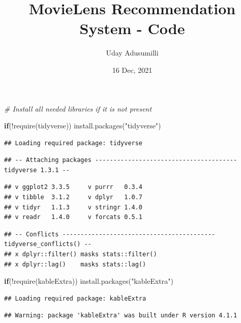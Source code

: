 \documentclass[
]{article}
\title{MovieLens Recommendation System - Code}
\author{Uday Adusumilli}
\date{16 Dec, 2021}
\newenvironment{Shaded}{}{}
\newcommand{\CommentTok}[1]{\textcolor[rgb]{0.38,0.63,0.69}{\textit{#1}}}
\newcommand{\ControlFlowTok}[1]{\textcolor[rgb]{0.00,0.44,0.13}{\textbf{#1}}}
\newcommand{\FunctionTok}[1]{\textcolor[rgb]{0.02,0.16,0.49}{#1}}
\newcommand{\NormalTok}[1]{#1}
\newcommand{\SpecialCharTok}[1]{\textcolor[rgb]{0.25,0.44,0.63}{#1}}
\newcommand{\StringTok}[1]{\textcolor[rgb]{0.25,0.44,0.63}{#1}}
\begin{document}
\maketitle

{
\setcounter{tocdepth}{2}
\tableofcontents
}
\begin{Shaded}
\begin{Highlighting}[]
\CommentTok{\# Install all needed libraries if it is not present}

\ControlFlowTok{if}\NormalTok{(}\SpecialCharTok{!}\FunctionTok{require}\NormalTok{(tidyverse)) }\FunctionTok{install.packages}\NormalTok{(}\StringTok{"tidyverse"}\NormalTok{) }
\end{Highlighting}
\end{Shaded}

\begin{verbatim}
## Loading required package: tidyverse
\end{verbatim}

\begin{verbatim}
## -- Attaching packages --------------------------------------- tidyverse 1.3.1 --
\end{verbatim}

\begin{verbatim}
## v ggplot2 3.3.5     v purrr   0.3.4
## v tibble  3.1.2     v dplyr   1.0.7
## v tidyr   1.1.3     v stringr 1.4.0
## v readr   1.4.0     v forcats 0.5.1
\end{verbatim}

\begin{verbatim}
## -- Conflicts ------------------------------------------ tidyverse_conflicts() --
## x dplyr::filter() masks stats::filter()
## x dplyr::lag()    masks stats::lag()
\end{verbatim}

\begin{Shaded}
\begin{Highlighting}[]
\ControlFlowTok{if}\NormalTok{(}\SpecialCharTok{!}\FunctionTok{require}\NormalTok{(kableExtra)) }\FunctionTok{install.packages}\NormalTok{(}\StringTok{"kableExtra"}\NormalTok{)}
\end{Highlighting}
\end{Shaded}

\begin{verbatim}
## Loading required package: kableExtra
\end{verbatim}

\begin{verbatim}
## Warning: package 'kableExtra' was built under R version 4.1.1
\end{verbatim}
\end{document}
